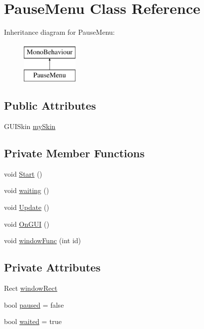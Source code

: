 \hypertarget{class_pause_menu}{}\section{Pause\+Menu Class Reference}
\label{class_pause_menu}
Inheritance diagram for Pause\+Menu\+:\begin{figure}[H]
\begin{center}
\leavevmode
\includegraphics[height=2.000000cm]{class_pause_menu}
\end{center}
\end{figure}
\subsection*{Public Attributes}
\begin{DoxyCompactItemize}
\item 
G\+U\+I\+Skin \hyperlink{class_pause_menu_af78d9844a86f8ffb0ebf4d711fe0c2ce}{my\+Skin}
\end{DoxyCompactItemize}
\subsection*{Private Member Functions}
\begin{DoxyCompactItemize}
\item 
void \hyperlink{class_pause_menu_a5325fe2fbc7a7d39408b6dab0a129c88}{Start} ()
\item 
void \hyperlink{class_pause_menu_a54ec674db33aad0505f69ca1433b9f69}{waiting} ()
\item 
void \hyperlink{class_pause_menu_ad66a0552c131257182ce524f1c71ce4c}{Update} ()
\item 
void \hyperlink{class_pause_menu_a2fbdab78365444f12e592144a336dcc8}{On\+G\+U\+I} ()
\item 
void \hyperlink{class_pause_menu_a9e4a263a0bbdfb0e1476ac04d101dfde}{window\+Func} (int id)
\end{DoxyCompactItemize}
\subsection*{Private Attributes}
\begin{DoxyCompactItemize}
\item 
Rect \hyperlink{class_pause_menu_a5cbd090dfd1fd8cd9d745d1334dad5cb}{window\+Rect}
\item 
bool \hyperlink{class_pause_menu_a5ebc8c7d38ad3c1be68a741fb133e6a2}{paused} = false
\item 
bool \hyperlink{class_pause_menu_a73081e2e0173f8cda0bb890d4b84b722}{waited} = true
\end{DoxyCompactItemize}


